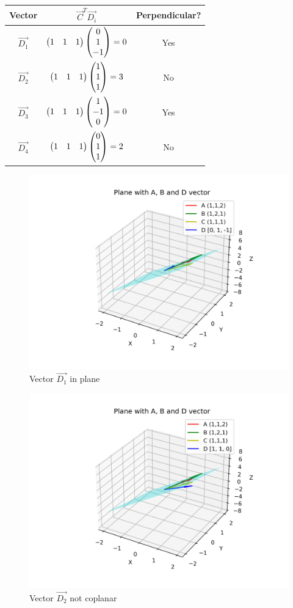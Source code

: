 \documentclass[12pt]{article}
\begin{document}
\begin{center}
\begin{tabular}{|c|c|c|}
\hline
Vector & ${\vec{C}}^T\vec{D_i}$ & Perpendicular? \\ \hline
$\vec{D_1}$ & $\begin{pmatrix}1 & 1 & 1\end{pmatrix}\begin{pmatrix}0 \\ 1 \\ -1\end{pmatrix} = 0$ & Yes \\ \hline
$\vec{D_2}$ & $\begin{pmatrix}1 & 1 & 1\end{pmatrix}\begin{pmatrix}1 \\ 1 \\ 1\end{pmatrix} = 3$  & No  \\ \hline
$\vec{D_3}$ & $\begin{pmatrix}1 & 1 & 1\end{pmatrix}\begin{pmatrix}1 \\ -1 \\ 0\end{pmatrix} = 0$ & Yes \\ \hline
$\vec{D_4}$ & $\begin{pmatrix}1 & 1 & 1\end{pmatrix}\begin{pmatrix}0 \\ 1 \\ 1\end{pmatrix} = 2$  & No  \\ \hline
\end{tabular}
\end{center}

\newpage
\begin{figure}[H]
    \centering
    \includegraphics[width=0.6\linewidth]{figures/plane_1.png}
    \caption{Vector $\vec{D_1}$ in plane}
\end{figure}

\begin{figure}[H]
    \centering
    \includegraphics[width=0.6\linewidth]{figures/plane_2.png}
    \caption{Vector $\vec{D_2}$ not coplanar}
\end{figure}
\end{document}
